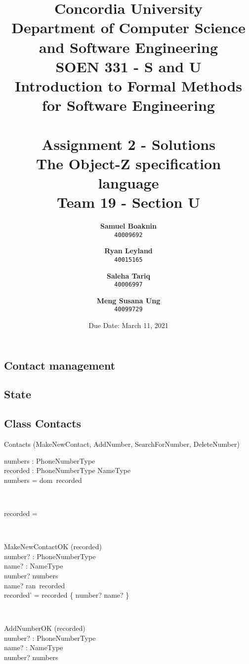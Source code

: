 \documentclass[12pt]{article}
\title{Concordia University\\
Department of Computer Science and Software Engineering\\
\textbf{SOEN 331 - S and U\\Introduction to Formal Methods\\for Software Engineering}\\
\ \\
\textbf{Assignment 2 - Solutions}\\
The Object-Z specification language\\
\textbf{Team 19 - Section U}}
\author{
	\textbf{Samuel Boaknin}\\
	\texttt{40009692}
	\and
	\textbf{Ryan Leyland}\\
	\texttt{40015165}
	\and
	\textbf{Saleha Tariq}\\
	\texttt{40006997}
	\and
	\textbf{Meng Susana Ung}\\
	\texttt{40099729}
}
\date{Due Date: March 11, 2021}
\begin{document}
\begin{spacing}{1.5}

\maketitle

\newpage

\section{Contact management}
\subsection{State}
\newpage
\subsection{Class Contacts}
\begin{class}{Contacts}
\also
\upharpoonright (MakeNewContact, AddNumber, SearchForNumber, DeleteNumber) \\
\begin{state}
numbers :  PhoneNumberType\\
recorded : PhoneNumberType \pfun NameType\\
\where
numbers = dom~recorded \\
\end{state} \\
\begin{init}
recorded = \emptyset \\ %
\end{init} \\
\begin{op}{MakeNewContactOK}
\Delta (recorded) \\
number? : PhoneNumberType\\
name? : NameType\\
\ST
number? \notin numbers\\
name? \notin ran~recorded\\
recorded' = recorded \cup \{ number? \mapsto name? \} \\
\end{op}\\
\begin{op}{AddNumberOK}
\Delta (recorded) \\
number? : PhoneNumberType\\
name? : NameType\\
\ST
number? \notin numbers\\

\end{op}
\end{class}
\end{spacing}
\end{document}
